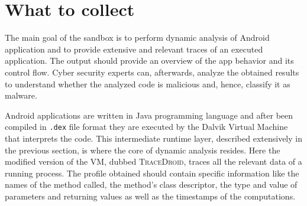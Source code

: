 \section{What to collect}
\label{sec:scope_design}

The main goal of the sandbox is to perform dynamic analysis of Android
application and to provide extensive and relevant traces of an
executed application. The output should provide an overview of the app
behavior and its control flow. Cyber security experts can,
afterwards, analyze the obtained results to understand whether the
analyzed code is malicious and, hence, classify it as malware.

Android applications are written in Java programming language and
after been compiled in \texttt{.dex} file format they are executed by the
Dalvik Virtual Machine that interprets the code. This intermediate
runtime layer, described extensively in the previous section, is where
the core of dynamic analysis resides. Here the modified version of the
VM, dubbed \textsc{TraceDroid}, traces all the relevant data of a running
process. The profile obtained should contain specific information like
the names of the method called, the method's class descriptor, the
type and value of parameters and returning values as well as the timestamps
of the computations.
